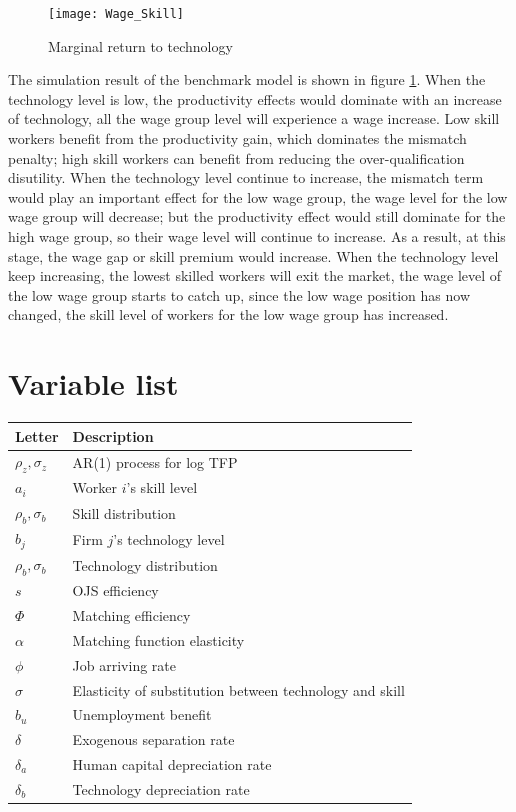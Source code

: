 \documentclass{article}
\newcommand{\1}{\mathbb{1}}
\begin{document}
\begin{figure}[h!]
\centering
\caption{Marginal return to technology}
\label{Wage1}
\texttt{[image: Wage\_Skill]}
\end{figure}

The simulation result of the benchmark model is shown in figure \ref{Wage1}. When the technology level is low, the productivity effects would dominate with an increase of technology, all the wage group level will experience a wage increase. Low skill workers benefit from the productivity gain, which dominates the mismatch penalty; high skill workers can benefit from reducing the over-qualification disutility. When the technology level continue to increase, the mismatch term would play an important effect for the low wage group, the wage level for the low wage group will decrease; but the productivity effect would still dominate for the high wage group, so their wage level will continue to increase. As a result, at this stage, the wage gap or skill premium would increase. When the technology level keep increasing, the lowest skilled workers will exit the market, the wage level of the low wage group starts to catch up, since the low wage position has now changed, the skill level of workers for the low wage group has increased. 


\clearpage



\clearpage
\section{Variable list}
\begin{longtable}{ll}
\hline \hline
Letter     &       Description                          \\
\hline 
$\rho_z, \sigma_z$  &  AR(1) process for log TFP \\
$a_i$                 & Worker $i$'s skill level                       \\
$\rho_b, \sigma_b$  &  Skill distribution\\
$b_j$                &  Firm $j$'s technology level                \\
$\rho_b, \sigma_b$  &  Technology distribution\\
$s$ & OJS efficiency \\
$\Phi$ & Matching efficiency \\
$\alpha$ & Matching function elasticity \\
$\phi$ & Job arriving rate \\
$\sigma$ & Elasticity of substitution between technology and skill \\
$b_u$ & Unemployment benefit \\
$\delta$ & Exogenous separation rate \\
$\delta_a$ & Human capital depreciation rate \\
$\delta_b$ & Technology depreciation rate \\
\hline 
\end{longtable}
\end{document}
